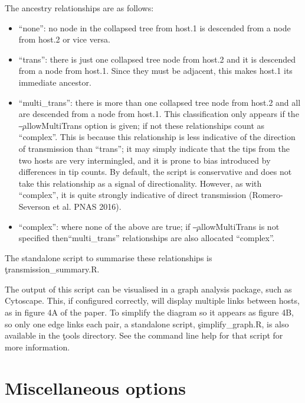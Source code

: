 The ancestry relationships are as follows:
\begin{itemize}
\item ``none'': no node in the collapsed tree from host.1 is descended from a node from host.2 or vice versa.
\item ``trans'': there is just one collapsed tree node from host.2 and it is descended from a node from host.1.
Since they must be adjacent, this makes host.1 its immediate ancestor.
\item ``multi\_trans'': there is more than one collapsed tree node from host.2 and all are descended from a node from host.1.
This classification only appears if the \c{--allowMultiTrans} option is given; if not these relationships count as ``complex''.
This is because this relationship is less indicative of the direction of transmission than ``trans''; it may simply indicate that the tips from the two hosts are very intermingled, and it is prone to bias introduced by differences in tip counts.
By default, the script is conservative and does not take this relationship as a signal of directionality.
However, as with ``complex'', it is quite strongly indicative of direct transmission (Romero-Severson et al. PNAS 2016).
\item ``complex'': where none of the above are true; if \c{--allowMultiTrans} is not specified then\break ``multi\_trans'' relationships are also allocated ``complex''.
\end{itemize}
The standalone script to summarise these relationships is \c{transmission\_summary.R}.

The output of this script can be visualised in a graph analysis package, such as Cytoscape. This, if configured correctly, will display multiple links between hosts, as in figure 4A of the \p paper. To simplify the diagram so it appears as figure 4B, so only one edge links each pair, a standalone script, \c{simplify\_graph.R}, is also available in the \c{tools} directory. See the command line help for that script for more information.

\section{Miscellaneous options}


